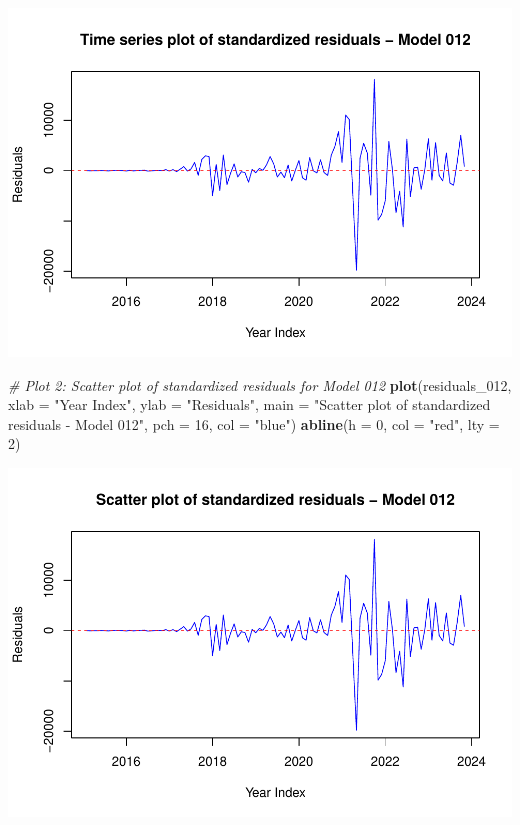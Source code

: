 \documentclass[
]{book}
\newenvironment{Shaded}{\begin{snugshade}}{\end{snugshade}}
\newcommand{\AttributeTok}[1]{\textcolor[rgb]{0.13,0.29,0.53}{#1}}
\newcommand{\CommentTok}[1]{\textcolor[rgb]{0.56,0.35,0.01}{\textit{#1}}}
\newcommand{\DecValTok}[1]{\textcolor[rgb]{0.00,0.00,0.81}{#1}}
\newcommand{\FunctionTok}[1]{\textcolor[rgb]{0.13,0.29,0.53}{\textbf{#1}}}
\newcommand{\NormalTok}[1]{#1}
\newcommand{\StringTok}[1]{\textcolor[rgb]{0.31,0.60,0.02}{#1}}
\begin{document}
\includegraphics{bookdown-demo_files/figure-latex/unnamed-chunk-48-1.pdf}

\begin{Shaded}
\begin{Highlighting}[]
\CommentTok{\# Plot 2: Scatter plot of standardized residuals for Model 012}
\FunctionTok{plot}\NormalTok{(residuals\_012,}
     \AttributeTok{xlab =} \StringTok{"Year Index"}\NormalTok{, }\AttributeTok{ylab =} \StringTok{"Residuals"}\NormalTok{,}
     \AttributeTok{main =} \StringTok{"Scatter plot of standardized residuals {-} Model 012"}\NormalTok{,}
     \AttributeTok{pch =} \DecValTok{16}\NormalTok{, }\AttributeTok{col =} \StringTok{"blue"}\NormalTok{)}
\FunctionTok{abline}\NormalTok{(}\AttributeTok{h =} \DecValTok{0}\NormalTok{, }\AttributeTok{col =} \StringTok{"red"}\NormalTok{, }\AttributeTok{lty =} \DecValTok{2}\NormalTok{)}
\end{Highlighting}
\end{Shaded}

\includegraphics{bookdown-demo_files/figure-latex/unnamed-chunk-48-2.pdf}
\end{document}

